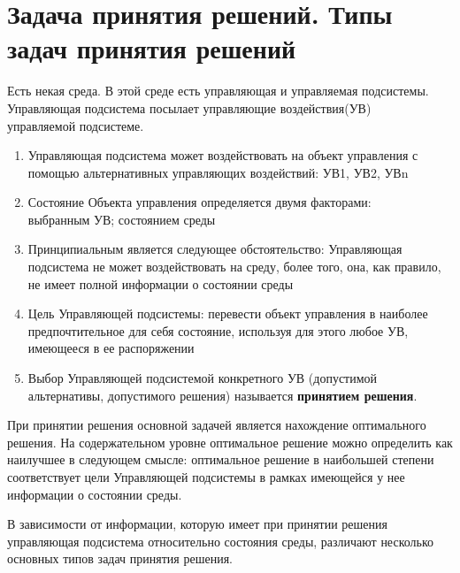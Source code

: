 \documentclass[17pt]{extarticle}
\begin{document}
\section{Задача принятия решений. Типы задач принятия решений}

Есть некая среда. В этой среде есть управляющая и управляемая подсистемы.
Управляющая подсистема посылает управляющие воздействия(УВ) \\ управляемой подсистеме.

\begin{enumerate}
      \item Управляющая подсистема может воздействовать на объект управления с помощью альтернативных управляющих воздействий: УВ1, УВ2, УВn
      \item Состояние Объекта управления определяется двумя факторами: \\ выбранным УВ; состоянием среды
      \item Принципиальным является следующее обстоятельство:
            Управляющая подсистема не может воздействовать на среду, более того, она, как правило, не имеет полной информации о состоянии среды
      \item Цель Управляющей подсистемы: перевести объект управления в наиболее предпочтительное для себя состояние,
            используя для этого любое УВ, имеющееся в ее распоряжении
      \item Выбор Управляющей подсистемой конкретного УВ (допустимой альтернативы, допустимого решения)
            называется \textbf{принятием решения}.
\end{enumerate}

При принятии решения основной задачей является нахождение оптимального решения.
На содержательном уровне оптимальное решение можно определить как наилучшее в следующем смысле:
оптимальное решение в наибольшей степени соответствует цели
Управляющей подсистемы в рамках имеющейся у нее информации о состоянии среды.

В зависимости от информации,
которую имеет при принятии решения \\ управляющая подсистема относительно состояния среды,
различают несколько основных типов задач принятия решения.
\end{document}
